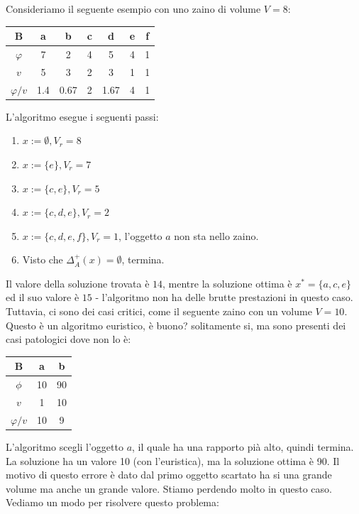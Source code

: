 \documentclass{article}
\begin{document}
Consideriamo il seguente esempio con uno zaino di volume $V=8$:
\begin{center}
    \begin{tabular}{c | c c c c c c}
        B             & a   & b    & c & d    & e & f \\
        \midrule
        $\varphi$     & 7   & 2    & 4 & 5    & 4 & 1 \\
        $v$           & 5   & 3    & 2 & 3    & 1 & 1 \\
        \midrule
        $\varphi / v$ & 1.4 & 0.67 & 2 & 1.67 & 4 & 1 \\
    \end{tabular}
\end{center}
L'algoritmo esegue i seguenti passi:
\begin{enumerate}
    \item $x:=\emptyset, V_r=8$
    \item $x:=\{e\}, V_r=7$
    \item $x:=\{c,e\}, V_r=5$
    \item $x:=\{c,d,e\}, V_r=2$
    \item $x:=\{c,d,e,f\}, V_r=1$, l'oggetto $a$ non sta nello zaino.
    \item Visto che $\Delta_A^+(x)=\emptyset$, termina.
\end{enumerate}
Il valore della soluzione trovata è $14$, mentre la soluzione ottima è $x^*=\{a,c,e\}$ ed
il suo valore è $15$ - l'algoritmo non ha delle brutte prestazioni in questo caso. Tuttavia,
ci sono dei casi critici, come il seguente zaino con un volume $V=10$. Questo è un algoritmo euristico,
è buono? solitamente si, ma sono presenti dei casi patologici dove non lo è:
\begin{center}
    \begin{tabular}{c|c c}
        B           & a  & b  \\
        \midrule
        $\phi$      & 10 & 90 \\
        $v$         & 1  & 10 \\
        \midrule
        $\varphi/v$ & 10 & 9  \\
    \end{tabular}
\end{center}

L'algoritmo scegli l'oggetto $a$, il quale ha una rapporto pià alto, quindi termina. La soluzione
ha un valore 10 (con l'euristica), ma la soluzione ottima è 90. Il motivo di questo errore
è dato dal primo oggetto scartato ha si una grande volume ma anche un grande valore. Stiamo
perdendo molto in questo caso.\\Vediamo un modo per risolvere questo problema:
\end{document}
